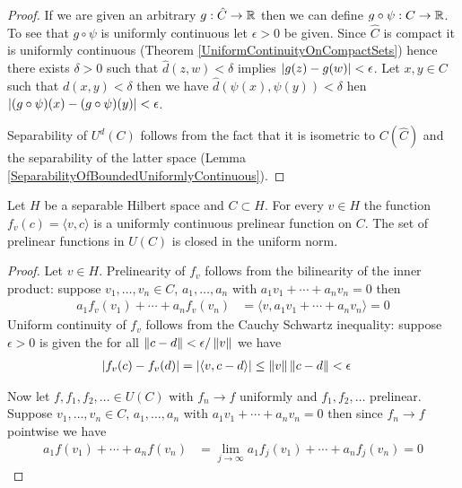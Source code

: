 \begin{proof}
If we are given an arbitrary $g : \hat{C} \to \mathbb{R}$ then we can define $g \circ \psi : C \to \mathbb{R}$.  To see that $g \circ \psi$ is uniformly continuous let $\epsilon > 0$ be given.  Since $\hat{C}$ is compact it is uniformly continuous (Theorem \ref{UniformContinuityOnCompactSets}) hence there exists $\delta>0$ such that $\hat{d}(z,w) < \delta$ implies $\left \vert g(z) - g(w) \right \vert < \epsilon$.  Let $x,y \in C$ such that $d(x,y) < \delta$ then we have $\hat{d}(\psi(x), \psi(y)) < \delta$ hen $\left \vert  (g \circ \psi)(x) - (g \circ \psi) (y) \right \vert < \epsilon$.

Separability of $U^d(C)$ follows from the fact that it is isometric to $C(\hat{C})$ and the separability of the latter space (Lemma \ref{SeparabilityOfBoundedUniformlyContinuous}).
\end{proof}

\begin{prop}\label{PrelinearUniformlyContinuousFunctions}Let $H$ be a separable Hilbert space and $C \subset H$.  For every $v \in H$ the function $f_v(c) = \langle v, c \rangle$ is a uniformly continuous prelinear function on $C$.  The set of prelinear functions in $U(C)$ is closed in the uniform norm.
\end{prop}
\begin{proof}
Let $v \in H$.  Prelinearity of $f_v$ follows from the bilinearity of the inner product: suppose $v_1, \dotsc, v_n \in C$, $a_1, \dotsc, a_n$ with $a_1v_1 + \dotsb + a_nv_n = 0$ then 
\begin{align*}
a_1 f_v(v_1) + \dotsb + a_n f_v(v_n) &= \langle v, a_1 v_1 + \dotsb + a_n v_n \rangle = 0
\end{align*}
Uniform continuity of $f_v$ follows from the Cauchy Schwartz inequality: suppose $\epsilon > 0$ is given the for all $\left \lVert c-d \right \rVert < \epsilon/\left \lVert v \right \rVert$ we have
\begin{align*}
\left \vert f_v(c) - f_v(d) \right \vert &= \left \vert \langle v, c - d \rangle \right \vert \leq \left \lVert v \right \rVert \left \lVert c-d \right \rVert < \epsilon
\end{align*}

Now let $f,f_1, f_2, \dotsc \in U(C)$ with $f_{n} \to f$ uniformly and $f_1, f_2, \dotsc$ prelinear.  Suppose $v_1, \dotsc, v_n \in C$, $a_1, \dotsc, a_n$ with $a_1v_1 + \dotsb + a_nv_n = 0$ then  since $f_n \to f$ pointwise we have
\begin{align*}
a_1 f(v_1) + \dotsb + a_n f(v_n) &= \lim_{j \to \infty} a_1 f_j(v_1) + \dotsb + a_n f_j(v_n) = 0
\end{align*}
\end{proof}

